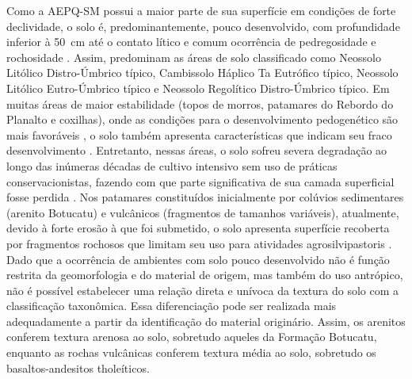 
Como a AEPQ-SM possui a maior parte de sua superfície em condições de forte declividade, o solo é, predominantemente, pouco desenvolvido, com profundidade inferior à 50~cm até o contato lítico e comum ocorrência de pedregosidade e rochosidade \cite{Miguel2010}. Assim, predominam as áreas de solo classificado como Neossolo Litólico Distro-Úmbrico típico, Cambissolo Háplico Ta Eutrófico típico, Neossolo Litólico Eutro-Úmbrico típico e Neossolo Regolítico Distro-Úmbrico típico. Em muitas áreas de maior estabilidade (topos de morros, patamares do Rebordo do Planalto e coxilhas), onde as condições para o desenvolvimento pedogenético são mais favoráveis \cite{Moser1990}, o solo também apresenta características que indicam seu fraco desenvolvimento \cite{MouraBueno2012}. Entretanto, nessas áreas, o solo sofreu severa degradação ao longo das inúmeras décadas de cultivo intensivo sem uso de práticas conservacionistas, fazendo com que parte significativa de sua camada superficial fosse perdida \cite{SamuelRosaEtAl2011a}. Nos patamares constituídos inicialmente por colúvios sedimentares (arenito Botucatu) e vulcânicos (fragmentos de tamanhos variáveis), atualmente, devido à forte erosão à que foi submetido, o solo apresenta superfície recoberta por fragmentos rochosos que limitam seu uso para atividades agrosilvipastoris \cite{MouraBueno2012}. Dado que a ocorrência de ambientes com solo pouco desenvolvido não é função restrita da geomorfologia e do material de origem, mas também do uso antrópico, não é possível estabelecer uma relação direta e unívoca da textura do solo com a classificação taxonômica. Essa diferenciação pode ser realizada mais adequadamente a partir da identificação do material originário. Assim, os arenitos conferem textura arenosa ao solo, sobretudo aqueles da Formação Botucatu, enquanto as rochas vulcânicas conferem textura média ao solo, sobretudo os basaltos-andesitos tholeíticos.

